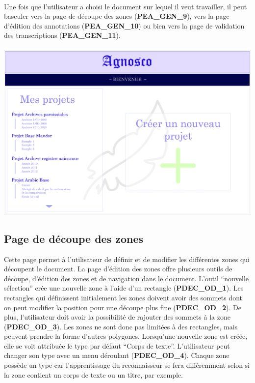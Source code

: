 \paragraph{}
Une fois que l’utilisateur a choisi le document sur lequel il veut travailler, il 
peut basculer vers la page de découpe des zones (\textbf{PEA\_GEN\_9}), vers
la page d’édition des annotations (\textbf{PEA\_GEN\_10}) ou bien vers la page
de validation des transcriptions (\textbf{PEA\_GEN\_11}).

\paragraph{}
\begin{mdframed}[frametitle={Figure 6 : Accueil de l'application}, innerbottommargin=10]
\begin{center}
\includegraphics[scale=0.05]{ihm1.jpg}
\end{center}
\end{mdframed}

\subsection{Page de découpe des zones}

Cette page permet à l’utilisateur de définir et de modifier les différentes
zones qui découpent le document. La page d’édition des zones offre
plusieurs outils de découpe, d’édition des zones et de navigation dans le
document. L’outil “nouvelle sélection” crée une nouvelle zone à l’aide d’un
rectangle (\textbf{PDEC\_OD\_1}). Les rectangles qui définissent initialement
les zones doivent avoir des sommets dont on peut modifier la position pour
une découpe plus fine (\textbf{PDEC\_OD\_2}). De plus, l’utilisateur doit avoir
la possibilité de rajouter des sommets à la zone (\textbf{PDEC\_OD\_3}). Les
zones ne sont donc pas limitées à des rectangles, mais peuvent prendre la forme
d’autres polygones. Lorsqu’une nouvelle zone est créée, elle se voit attribuée
le type par défaut “Corps de texte”. L’utilisateur peut changer son type avec
un menu déroulant (\textbf{PDEC\_OD\_4}). Chaque zone possède un type car
l’apprentissage du reconnaisseur se fera différemment selon si la zone contient
un corps de texte ou un titre, par exemple.

